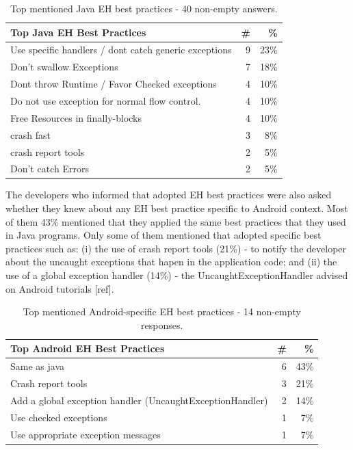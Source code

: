\begin{table}
\scriptsize
\centering
\begin{tabular}{lrr}
\hline
\bfseries{Top Java EH Best Practices} & \bfseries{\#} & \bfseries{\%} \\
\hline
Use specific handlers / dont catch generic exceptions	& 9 & 23\% \\
Don't swallow Exceptions	 & 7 & 18\% \\
Dont throw Runtime / Favor Checked exceptions & 4 &	10\% \\
Do not use exception for normal  flow control. &	4 &	10\% \\
Free Resources in finally-blocks	& 4	& 10\% \\
crash fast	 & 3 &	8\% \\
crash report tools	&  2 &	5\% \\
Don't catch Errors 	&  2 &	5\% \\
\hline
\end{tabular}
\caption{Top mentioned Java EH best practices -  40 non-empty answers. }
\label{tab:javapractices}
\end{table}			
				
The developers who informed that adopted EH best practices were also asked whether they knew about any EH best practice specific to Android context. Most of them 43\% mentioned that they applied the same best practices that they used in Java programs. Only some of them mentioned that adopted specific best practices such as: (i) the use of crash report tools (21\%)  - to notify the developer about the uncaught exceptions that hapen in the application code; and (ii) the use of a global exception handler (14\%) - the UncaughtExceptionHandler advised on Android tutorials [ref].					
					
					
\begin{table}
\scriptsize
\centering
\begin{tabular}{lrr}
\hline
\bfseries{Top Android EH Best Practices } & \bfseries{\#} & \bfseries{\%} \\
\hline
Same as java	& 6 &	43\% \\
Crash report tools	 & 3 &	21\% \\
Add a global exception handler (UncaughtExceptionHandler)	 & 2 & 14\% \\
Use checked exceptions	& 1 &	7\% \\
Use appropriate exception messages	& 1 &	7\% \\
\hline
\end{tabular}
\caption{Top mentioned Android-specific EH best practices -  14 non-empty responses. }
\label{tab:androidpractices}
\end{table}			

